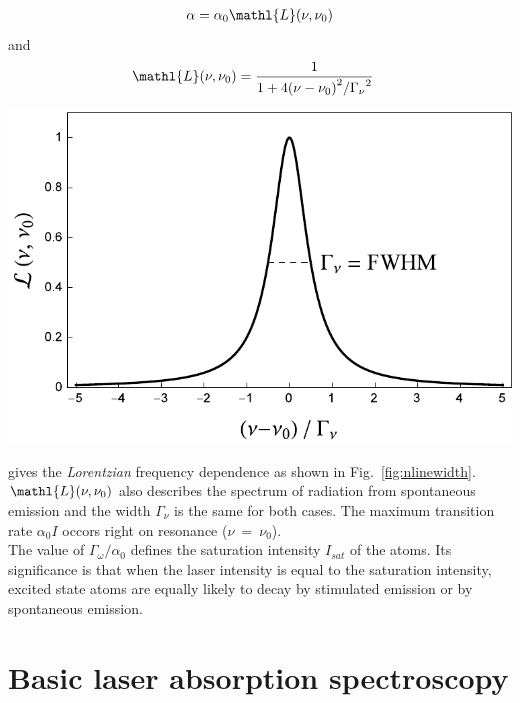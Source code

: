 \begin{minipage}[c][][c]{.45\textwidth}
\begin{align}
    \alpha = \alpha_0 \mathl{L}(\nu,\nu_0)
\end{align}
and
\begin{align}
    \mathl{L}(\nu,\nu_0) &= \frac{1}{ 1+4 {(\nu-\nu_0)}^2 / {\Gamma_\nu}^2 }
\end{align}
\end{minipage}
\hfill
\begin{minipage}[c]{.45\textwidth}
\includegraphics[width=\textwidth]{nLinewidth}
\label{fig:nlinewidth}
\end{minipage}
\bigskip

gives the \textit{Lorentzian} frequency dependence as shown in Fig.~\ref{fig:nlinewidth}.
\(\mathl{L}(\nu,\nu_0) \) also describes the spectrum of radiation from spontaneous emission
and the width \(\Gamma_\nu \) is the same for both cases. The maximum transition rate 
\(\alpha_0 I \) occors right on resonance (\(\nu~=~\nu_0 \)).\\
The value of \(\Gamma_\omega / \alpha_0 \) defines the saturation intensity \(I_{sat} \) of the
atoms. Its significance is that when the laser intensity is equal to the saturation intensity,
excited state atoms are equally likely to decay by stimulated emission or by spontaneous emission.
\pagebreak

\section{Basic laser absorption spectroscopy}   %



